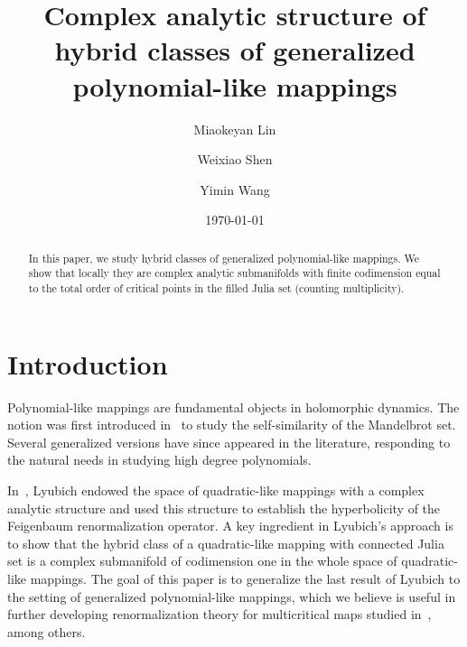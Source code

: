 \documentclass{amsart}
\title[Hybrid classes]{Complex analytic structure of hybrid classes of generalized polynomial-like mappings}
\author{Miaokeyan Lin}
\author{Weixiao Shen}
\author{Yimin Wang}
\date{\today}
\numberwithin{equation}{section}
\theoremstyle{definition}
\theoremstyle{remark}
\begin{document}
\maketitle
\begin{abstract}
In this paper, we study hybrid classes of generalized polynomial-like mappings. We show that locally they are complex analytic submanifolds with finite codimension equal to the total order of critical points in the filled Julia set (counting multiplicity). 
 \end{abstract}


\section{Introduction}
Polynomial-like mappings are fundamental objects in holomorphic dynamics. The notion was first introduced in~\cite{DH2} to study the self-similarity of the Mandelbrot set. Several generalized versions have since appeared in the literature, %
responding to the natural needs in studying high degree polynomials.


In~\cite{L2}, Lyubich endowed the space of quadratic-like mappings with a complex analytic structure and used this structure to establish the hyperbolicity of the Feigenbaum renormalization operator. A key ingredient in Lyubich's approach is to show that the hybrid class of a quadratic-like mapping with connected Julia set is a complex submanifold of codimension one in the whole space of quadratic-like mappings.  
The goal of this paper is to generalize the last result of Lyubich to the setting of generalized polynomial-like mappings, which we believe is useful in further developing renormalization theory for multicritical maps studied in~\cite{Smania, Wang}, among others. 
\end{document}
